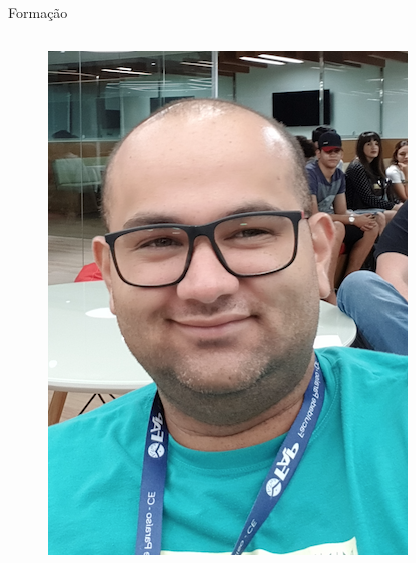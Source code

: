 \documentclass{beamer}
\begin{document}
\begin{frame}{Formação}
\begin{columns}[T]
\begin{column}{.35\textwidth}
\begin{figure}[t!]
                \includegraphics[scale=0.4]{face.png}
                \label{fig:me1}
            \end{figure}
        \end{column}%
    \end{columns}
\end{frame}
%
\end{document}
